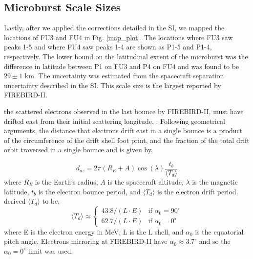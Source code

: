\documentclass[draft, linenumbers]{agujournal}
\begin{document}
\subsection{Microburst Scale Sizes} \label{scale_size} %
Lastly, after we applied the  corrections detailed in the SI, we mapped the locations of FU3 and FU4 in Fig. \ref{map_plot}. The locations where FU3 saw peaks 1-5 and where FU4 saw peaks 1-4 are shown as P1-5 and P1-4, respectively. The lower bound on the latitudinal extent of the microburst was the difference in latitude between P1 on FU3 and P4 on FU4 and was found to be $29 \pm 1$ km. The uncertainty was estimated from the spacecraft separation uncertainty described in the SI. This scale size is the largest reported by FIREBIRD-II.

  the scattered electrons observed in the last bounce by FIREBIRD-II, must have drifted east from their initial scattering longitude, . Following geometrical arguments, the distance that electrons drift east in a single bounce is a product of the circumference of the drift shell foot print, and the fraction of the total drift orbit traversed in a single bounce and is given by, 

\begin{equation}
d_{az} = 2 \pi (R_E + A) \cos(\lambda) \frac{t_b}{\langle T_{d} \rangle}
\label{bounce_drift}
\end{equation} where $R_E$ is the Earth's radius, $A$ is the spacecraft altitude, $\lambda$ is the magnetic latitude, $t_b$ is the electron bounce period, and $\langle T_{d} \rangle$ is the electron drift period. \citet{Parks2003} derived $\langle T_{d} \rangle$ to be,
\begin{equation}
\langle T_{d} \rangle \approx
\begin{cases}
43.8 /(L \cdot E) & \text{if } \alpha_0 = 90^{\circ} \\    62.7/(L \cdot E) & \text{if } \alpha_0 = 0^{\circ}
\end{cases}
\label{drift}
\end{equation} where E is the electron energy in MeV, L is the L shell, and $\alpha_0$ is the equatorial pitch angle. Electrons mirroring at FIREBIRD-II have $\alpha_0 {\approx} 3.7^{\circ}$ and so the $\alpha_0 = 0^{\circ}$ limit was used.
\end{document}
